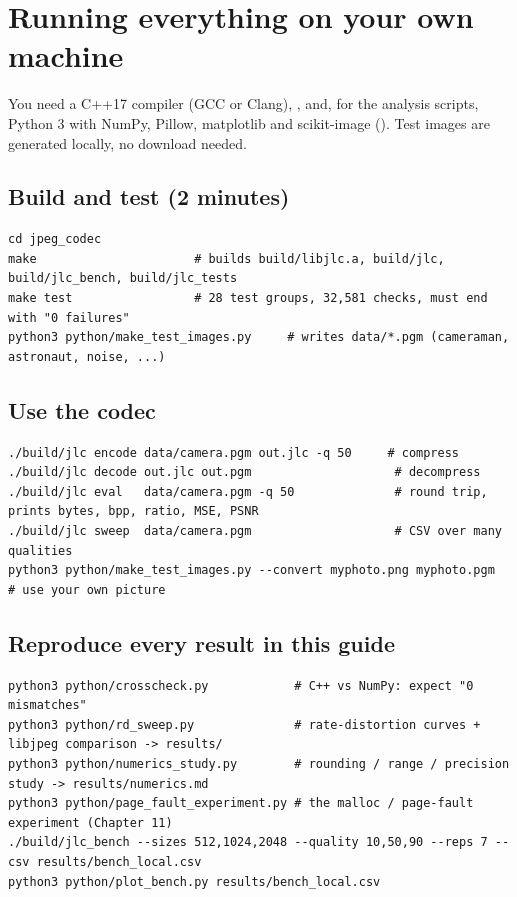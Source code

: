 \chapter{Running everything on your own machine}\label{ch:running}

You need a C++17 compiler (GCC or Clang), , and, for the analysis scripts, Python 3 with NumPy, Pillow, matplotlib and scikit-image (). Test images are generated locally, no download needed.

\section{Build and test (2 minutes)}

\begin{lstlisting}[style=shell]
cd jpeg_codec
make                      # builds build/libjlc.a, build/jlc, build/jlc_bench, build/jlc_tests
make test                 # 28 test groups, 32,581 checks, must end with "0 failures"
python3 python/make_test_images.py     # writes data/*.pgm (cameraman, astronaut, noise, ...)
\end{lstlisting}

\section{Use the codec}

\begin{lstlisting}[style=shell]
./build/jlc encode data/camera.pgm out.jlc -q 50     # compress
./build/jlc decode out.jlc out.pgm                    # decompress
./build/jlc eval   data/camera.pgm -q 50              # round trip, prints bytes, bpp, ratio, MSE, PSNR
./build/jlc sweep  data/camera.pgm                    # CSV over many qualities
python3 python/make_test_images.py --convert myphoto.png myphoto.pgm   # use your own picture
\end{lstlisting}

\section{Reproduce every result in this guide}

\begin{lstlisting}[style=shell]
python3 python/crosscheck.py            # C++ vs NumPy: expect "0 mismatches"
python3 python/rd_sweep.py              # rate-distortion curves + libjpeg comparison -> results/
python3 python/numerics_study.py        # rounding / range / precision study -> results/numerics.md
python3 python/page_fault_experiment.py # the malloc / page-fault experiment (Chapter 11)
./build/jlc_bench --sizes 512,1024,2048 --quality 10,50,90 --reps 7 --csv results/bench_local.csv
python3 python/plot_bench.py results/bench_local.csv
\end{lstlisting}

